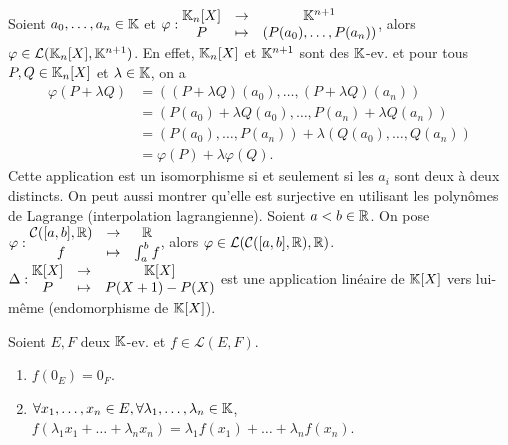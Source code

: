 \documentclass[12pt, a4paper]{report}
\begin{document}
\begin{example}
    \begin{outline}[enumerate]
        \1 Soient $a_0,\dots,a_n\in\mathbb{K}$ et $\varphi:\begin{matrix}
            \mathbb{K}_n[X] &\to &\mathbb{K}^{n+1}\\
            P &\mapsto &(P(a_0),\dots,P(a_n))
        \end{matrix}$, alors $\varphi\in\mathcal L(\mathbb{K}_n[X],\mathbb{K}^{n+1})$.
        \2 En effet, $\mathbb{K}_n[X]$ et $\mathbb{K}^{n+1}$ sont des $\mathbb{K}$-ev. et pour tous $P,Q\in\mathbb{K}_n[X]$ et $\lambda\in\mathbb{K}$, on a
        \begin{align*}
            \varphi(P+\lambda Q) &= ((P+\lambda Q)(a_0),\dots,(P+\lambda Q)(a_n))\\
            &= (P(a_0)+\lambda Q(a_0),\dots,P(a_n)+\lambda Q(a_n))\\
            &= (P(a_0),\dots,P(a_n)) + \lambda(Q(a_0),\dots,Q(a_n))\\
            &= \varphi(P) + \lambda\varphi(Q).
        \end{align*}
        \2 Cette application est un isomorphisme si et seulement si les $a_i$ sont deux à deux distincts. On peut aussi montrer qu'elle est surjective en utilisant les polynômes de Lagrange (interpolation lagrangienne).
        \1 Soient $a < b \in \mathbb{R}$. On pose $\varphi : \begin{matrix}
            \mathcal C([a,b],\mathbb{R}) &\to &\mathbb{R}\\
            f &\mapsto &\int_a^b f
        \end{matrix}$, alors $\varphi\in\mathcal L(\mathcal C([a,b],\mathbb{R}),\mathbb{R})$.
        \1 $\Delta : \begin{matrix}
            \mathbb{K}[X] &\to &\mathbb{K}[X]\\
            P &\mapsto &P(X+1) - P(X)
        \end{matrix}$ est une application linéaire de $\mathbb{K}[X]$ vers lui-même (endomorphisme de $\mathbb{K}[X]$).
    \end{outline}
\end{example}

\begin{property}
    Soient $E,F$ deux $\mathbb{K}$-ev. et $f \in \mathcal L(E,F)$.
    \begin{enumerate}
        \item $f(0_E) = 0_F$.
        \item $\forall x_1,\dots,x_n\in E, \forall \lambda_1,\dots,\lambda_n\in\mathbb{K}$, $f(\lambda_1 x_1 + \dots + \lambda_n x_n) = \lambda_1 f(x_1) + \dots + \lambda_n f(x_n)$.
    \end{enumerate}
\end{property}
\end{document}

